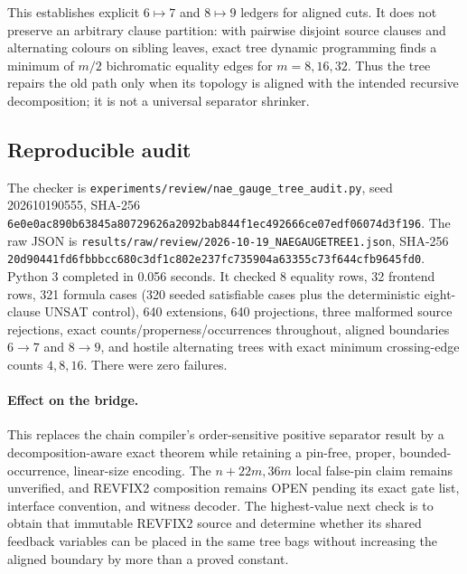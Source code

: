 This establishes explicit $6\mapsto7$ and $8\mapsto9$ ledgers for aligned
cuts.  It does not preserve an arbitrary clause partition: with pairwise
disjoint source clauses and alternating colours on sibling leaves, exact tree
dynamic programming finds a minimum of $m/2$ bichromatic equality edges for
$m=8,16,32$.  Thus the tree repairs the old path only when its topology is
aligned with the intended recursive decomposition; it is not a universal
separator shrinker.

\subsection*{Reproducible audit}
The checker is
\texttt{experiments/review/nae\_gauge\_tree\_audit.py}, seed
202610190555, SHA-256
\texttt{6e0e0ac890b63845a80729626a2092bab844f1ec492666ce07edf06074d3f196}.
The raw JSON is
\texttt{results/raw/review/2026-10-19\_NAEGAUGETREE1.json}, SHA-256
\texttt{20d90441fd6fbbbcc680c3df1c802e237fc735904a63355c73f644cfb9645fd0}.
Python 3 completed in 0.056 seconds.  It checked 8 equality rows, 32 frontend
rows, 321 formula cases (320 seeded satisfiable cases plus the deterministic
eight-clause UNSAT control), 640 extensions, 640 projections, three malformed
source rejections, exact counts/properness/occurrences throughout, aligned
boundaries $6\to7$ and $8\to9$, and hostile alternating trees with exact
minimum crossing-edge counts $4,8,16$.  There were zero failures.

\paragraph{Effect on the bridge.}
This replaces the chain compiler's order-sensitive positive separator result
by a decomposition-aware exact theorem while retaining a pin-free, proper,
bounded-occurrence, linear-size encoding.  The $n+22m,36m$ local false-pin
claim remains unverified, and REVFIX2 composition remains OPEN pending its
exact gate list, interface convention, and witness decoder.  The highest-value
next check is to obtain that immutable REVFIX2 source and determine whether
its shared feedback variables can be placed in the same tree bags without
increasing the aligned boundary by more than a proved constant.

